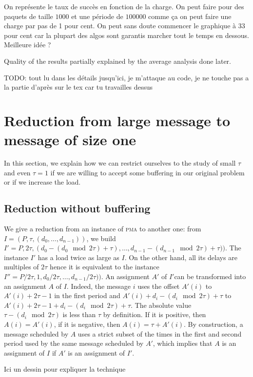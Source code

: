 \documentclass[10pt, conference, letterpaper]{IEEEtran}
\newcommand\pma{\textsc{pma}\xspace}
\newcommand{\todo}[1]{{\color{red} TODO: {#1}}}
\begin{document}
On représente le taux de succès en fonction de la charge. On peut faire
pour des paquets de taille $1000$ et une période de $100 000$ comme ça on
peut faire une charge par pas de 1 pour cent. On peut sans doute commencer
le graphique à 33 pour cent car la plupart des algos sont garantis marcher 
tout le temps en dessous. 
Meilleure idée ? 

Quality of the results partially explained by the average analysis done later.
 
\todo{tout lu dans les détails jusqu'ici, je m'attaque au code, je ne touche pas a la partie d'après  sur le tex car tu travailles dessus}
\section{Reduction from large message to message of size one}

In this section, we explain how we can restrict ourselves to the study 
of small $\tau$ and even $\tau = 1$ if we are willing to accept some 
buffering in our original problem or if we increase the load.


\subsection{Reduction without buffering}

We give a reduction from an instance of \pma to another one:
from $I = (P,\tau,(d_{0},\dots,d_{n-1}))$, we build $I' = P, 2\tau, (d_{0}-(d_{0}\mod 2\tau)+ \tau),\dots,d_{n-1} - (d_{n-1} \mod 2\tau) + \tau))$. The instance $I'$ has a load twice as large as $I$.
On the other hand, all its delays are multiples of $2\tau$ hence it is equivalent to the instance  $I'' = P/2\tau, 1,d_{0}/ 2\tau,\dots,d_{n-1} /2\tau))$. An assignment $A'$ of $I'$can be transformed into an assignment $A$ of $I$. Indeed, the message $i$ uses the offset $A'(i)$
to $A'(i) + 2\tau -1$ in the first period and $A'(i) + d_{i} - (d_{i} \mod 2\tau) + \tau$ to $A'(i) + 2\tau -1+ d_{i} - (d_{i} \mod 2\tau)  + \tau$.  The absolute value $\tau - (d_{i} \mod 2\tau)$ is less than $\tau$ by definition. If it is positive, then $A(i) = A'(i)$, if it is negative, then $A(i) = \tau + A'(i)$. By construction, a message scheduled by $A$ uses a strict subset of the times in the first and second period used by the same message scheduled by $A'$, which implies that $A$ is an assignment of $I$ if $A'$ is an assignment of $I'$. 

Ici un dessin pour expliquer la technique
\end{document}
